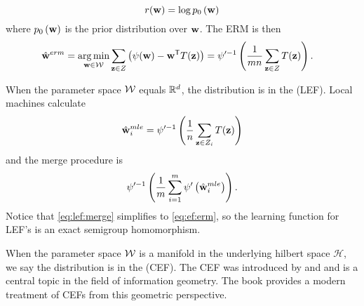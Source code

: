 \documentclass[thesis.tex]{subfiles}
\newcommand{\set}[1]{\mathcal {#1}}
\newcommand{\prior}[1]{p_0\left({#1}\right)}
\begin{document}
\begin{equation}
    \reg(\w) = \log\prior\w
\end{equation}
where $\prior\w$ is the prior distribution over $\mathbf w$.
The ERM is then
\newcommand{\deriv}[2]{\frac{\dd {#1}}{\dd {#2}}}
\begin{align}
    \label{eq:ef:erm}
    \hat{\mathbf w}^{erm} 
    &= \operatorname*{arg\,min}_{\mathbf w\in{\mathcal W}} \sum_{\mathbf z\in Z}\left( \psi(\mathbf w) - {\mathbf w}^{\mathsf{T}} T(\mathbf z)\right)
    = \psi'^{-1} \left(\frac{1}{mn} \sum_{\mathbf z\in Z} T(\mathbf z) \right)
    .
\end{align}


\begin{method}
    When the parameter space ${\mathcal W}$ equals $\mathbb R^d$,
    the distribution is in the  (LEF).
    Local machines calculate 
    \begin{equation}
        \hat{\mathbf w}^{mle}_i
        = \psi'^{-1} \left(\frac{1}{n} \sum_{\mathbf z\in Z_i} T(\mathbf z) \right)
    \end{equation}
    and the merge procedure is
    \begin{equation}
        \label{eq:lef:merge}
        \psi'^{-1} 
        \left(
            \frac{1}{m} \sum_{i=1}^m \psi' \left(\hat{\mathbf w}^{mle}_i\right)
        \right)
        .
    \end{equation}
    Notice that \eqref{eq:lef:merge} simplifies to \eqref{eq:ef:erm},
    so the learning function for LEF's is an exact semigroup homomorphism.
\end{method}

When the parameter space ${\mathcal W}$ is a manifold in the underlying hilbert space $\set H$,
we say the distribution is in the  (CEF). 
The CEF was introduced by \citet{efron1975defining} and \citet{amari1982differential} and is a central topic in the field of information geometry.
The book \citet{amari2016information} provides a modern treatment of CEFs from this geometric perspective.

%
\end{document}
